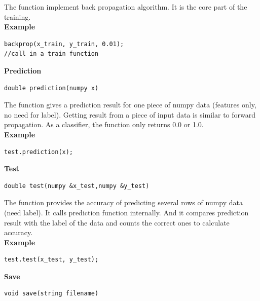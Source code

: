 \documentclass[letterpaper]{article}
\begin{document}
The function implement back propagation algorithm. It is the core part of the training.\\
\textbf{Example}
\begin{lstlisting}[language={[ANSI]C++},keywordstyle=\color{blue!70},commentstyle=\color{red!50!green!50!blue!50},frame=shadowbox, rulesepcolor=\color{red!20!green!20!blue!20}]
backprop(x_train, y_train, 0.01);
//call in a train function
\end{lstlisting}
\textbf{\Large Prediction}
\begin{lstlisting}[language={[ANSI]C++},keywordstyle=\color{blue!70},commentstyle=\color{red!50!green!50!blue!50},frame=shadowbox, rulesepcolor=\color{red!20!green!20!blue!20}]
double prediction(numpy x)
\end{lstlisting}

The function gives a prediction result for one piece of numpy data (features only, no need for label). Getting result from a piece of input data is similar to forward propagation. As a classifier, the function only returns 0.0 or 1.0.\\
\textbf{Example}
\begin{lstlisting}[language={[ANSI]C++},keywordstyle=\color{blue!70},commentstyle=\color{red!50!green!50!blue!50},frame=shadowbox, rulesepcolor=\color{red!20!green!20!blue!20}]
test.prediction(x);
\end{lstlisting}
\textbf{\Large Test}
\begin{lstlisting}[language={[ANSI]C++},keywordstyle=\color{blue!70},commentstyle=\color{red!50!green!50!blue!50},frame=shadowbox, rulesepcolor=\color{red!20!green!20!blue!20}]
double test(numpy &x_test,numpy &y_test)
\end{lstlisting}

The function provides the accuracy of predicting several rows of numpy data (need label). It calls prediction function internally. And it compares prediction result with the label of the data and counts the correct ones to calculate accuracy. \\
\textbf{Example}
\begin{lstlisting}[language={[ANSI]C++},keywordstyle=\color{blue!70},commentstyle=\color{red!50!green!50!blue!50},frame=shadowbox, rulesepcolor=\color{red!20!green!20!blue!20}]
test.test(x_test, y_test);
\end{lstlisting}
\textbf{\Large Save}
\begin{lstlisting}[language={[ANSI]C++},keywordstyle=\color{blue!70},commentstyle=\color{red!50!green!50!blue!50},frame=shadowbox, rulesepcolor=\color{red!20!green!20!blue!20}]
void save(string filename)
\end{lstlisting}
\end{document}
